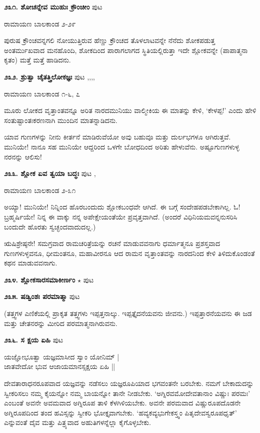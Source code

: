 {\medskip
\noindent\textbf{೨೩೧. ಶೋಚನ್ನೇವ ಮುಹುಃ ಕ್ರೌಂಚೀಂ} \hfill ಪುಟ \pageref{203c}

\hfill ರಾಮಾಯಣ ಬಾಲಕಾಂಡ ೨-೨೯

ಪುರುಷ ಕ್ರೌಂಚವನ್ನಗಲಿ ನೋಯುತ್ತಿರುವ ಹೆಣ್ಣು ಕ್ರೌಂಚದ ತೊಳಲಾಟವನ್ನೇ ನೆನೆದು ಶೋಕಪಡುತ್ತ ಅಂತರ್ಮುಖವಾದ ಮನಹೊಂದಿ, ಶೋಕದಿಂದ ಪಾರಾಗಲಾಗದ ಸ್ಥಿತಿಯಲ್ಲಿರುತ್ತಾ ಇದೇ ಶ್ಲೋಕವನ್ನೇ (ಪಾಪಾತ್ಮನಾ ಕೃತಂ) ಮತ್ತೆ ಮತ್ತೆ ಹಾಡಿದನು.

\medskip
\noindent\textbf{೨೩೨. ಶ್ರುತ್ವಾ ಚೈತತ್ತ್ರಿಲೋಕಜ್ಞಃ} \hfill ಪುಟ \pageref{153},\pageref{163},\pageref{194},\pageref{246},\pageref{251}

\hfill ರಾಮಾಯಣ ಬಾಲಕಾಂಡ ೧-೬, ೭

ಮೂರು ಲೋಕದ ವೃತ್ತಾಂತವನ್ನೂ ಅರಿತ ನಾರದಮುನಿಯು ವಾಲ್ಮೀಕಿಯ ಈ ಮಾತನ್ನು ಕೇಳಿ, `ಕೇಳಪ್ಪ!' ಎಂದು ಹೇಳಿ ಸಂತುಷ್ಟಾಂತಃಕರಣನಾಗಿ ಮುಂದಿನ ಮಾತನ್ನಾಡಿದನು.

ಯಾವ ಗುಣಗಳನ್ನು ನೀನು ಕೀರ್ತನೆ ಮಾಡಿರುವೆಯೋ ಅವು ಬಹುವೂ ಮತ್ತು ದುರ್ಲಭಗಳೂ ಆಗಿರುತ್ತವೆ. ಮುನಿಯೇ! ನಾನೂ ಸಹ ಮುನಿಯೇ ಆದ್ದರಿಂದ ಒಳಗೇ ಬೋಧದಿಂದ ಅರಿತು ಹೇಳುವೆನು. ಅಷ್ಟೂಗುಣಗಳುಳ್ಳ ನರನನ್ನು ಆಲಿಸು!

\medskip
\noindent\textbf{೨೩೩. ಶ್ಲೋಕ ಏವ ತ್ವಯಾ ಬದ್ಧಃ} \hfill ಪುಟ \pageref{157},\pageref{181}

\hfill ರಾಮಾಯಣ ಬಾಲಕಾಂಡ ೨-೩೧

ಅಯ್ಯಾ! ಮುನಿಯೇ! ನಿನ್ನಿಂದ ಹೊರಬಂದುದು ಶ್ಲೋಕಬಂಧವೇ ಆಗಿದೆ. ಈ ಬಗ್ಗೆ ಸಂದೇಹಪಡಬೇಕಾಗಿಲ್ಲ. ಓ! ಬ್ರಹ್ಮರ್ಷಿಯೇ! ನಿನ್ನ ಈ ವಾಕ್ಕು  ನನ್ನ ಅಪೇಕ್ಷೇಯಂತೆಯೇ ಪ್ರವೃತ್ತವಾಗಿದೆ. (ಅಂದರೆ ವಿಧಿನಿಯಮವನ್ನನುಸರಿಸಿ ಬಂದುದೇ ಹೊರತು ಸ್ವಚ್ಛಂದವಾದುದಲ್ಲ.)

ಋಷಿಶ್ರೇಷ್ಠನೇ! ಸಮಗ್ರವಾದ ರಾಮಚರಿತ್ರೆಯನ್ನು ರಚನೆ ಮಾಡುವವನಾಗು ಧರ್ಮಾತ್ಮನೂ ಪ್ರಶಸ್ತವಾದ ಗುಣಗಳುಳ್ಳವನೂ, ಧೀಮಂತನೂ, ಮಹಾವೀರನೂ ಆದ ರಾಮನ ವೃತ್ತಾಂತವನ್ನು ನಾರದನಿಂದ ಕೇಳಿ ತಿಳಿದುಕೊಂಡಂತೆ ಕಥನ ಮಾಡುವವನಾಗು. 

\medskip
\noindent\textbf{೨೩೪. ಶ್ಲೋಕಸಾರಸಮಾಕೀರ್ಣಂ} $\star$ \hfill ಪುಟ \pageref{152}

\medskip
\noindent\textbf{೨೩೫. ಷಡ್ವಿಂಶಃ ಪರಮಾತ್ಮಾ} \hfill ಪುಟ \pageref{185}

(ತತ್ತ್ವಗಳ ಎಣಿಕೆಯಲ್ಲಿ ಪ್ರಾಕೃತ ತತ್ತ್ವಗಳು ಇಪ್ಪತ್ತನಾಲ್ಕು. ಇಪ್ಪತ್ತೈದನೆಯವನು ಜೀವನು.) ಇಪ್ಪತ್ತಾರನೆಯವನು ಈ ಜಡ ಮತ್ತು ಚೇತನರನ್ನು ಮೀರಿದ ಪರಮಾತ್ಮನಾಗಿರುವನು. 

\medskip
\noindent\textbf{೨೩೬. ಸ ಕ್ಷಯ ಏಹಿ} \hfill ಪುಟ \pageref{162}

\begin{shloka}
ಯಜ್ಞೋಭೂತ್ವಾ ಯಜ್ಞಮಾಸೀದ ಸ್ವಾಂ ಯೋನಿಮ್ |\\
ಜಾತವೇದೋ ಭುವ ಆಜಾಯಮಾನಸ್ಸಕ್ಷಯ ಏಹಿ ||
\end{shloka} 

ದೇವತಾರಾಧನರೂಪವಾದ ಯಜ್ಞವನ್ನು ನಡೆಸಲು ಯಜ್ಞರೂಪಿಯಾದ ಭಗವಂತನೇ ಬರಬೇಕು. ನಮಗೆ ಬೇಕಾದುದನ್ನು ಸ್ವೀಕರಿಸಲು ನಮ್ಮ ಕೈಯನ್ನೋ ನಮ್ಮ ಬಾಯನ್ನೋ ತಾನೇ ನೀಡಬೇಕು. `ಅಗ್ನಿರವಮೋದೇವತಾನಾಂ ವಿಷ್ಣುಃ ಪರಮಃ' ಎಂಬಂತೆ ಅವನೇ ಅವಮವಾದ ಅಗ್ನಿರೂಪ ತಾಳಿ ಕೆಳಗಿಳಿಯಬೇಕು. ಅವನೇ ಪರಮವಾದ ವಿಷ್ಣುರೂಪದೊಡನೇ ಅಗ್ನಿರೂಪದಿಂದ ತಂದ ಹವಿಸ್ಸನ್ನು ಸ್ವೀಕರಿ ಭೋಕ್ತೃವಾಗಬೇಕು. `ಹವ್ಯಕವ್ಯಭುಗೇಕಸ್ತ್ವಂ ಪಿತೃದೇವಸ್ವರೂಪಧೃತ್' ಎನ್ನುವಂತೆ ದೈವ ಮತ್ತು ಪಿತ್ರ್ಯವಾದ ಅಹುತಿಗಳನ್ನೆಲ್ಲಾ ಕೈಗೊಳ್ಳಬೇಕು.

}
